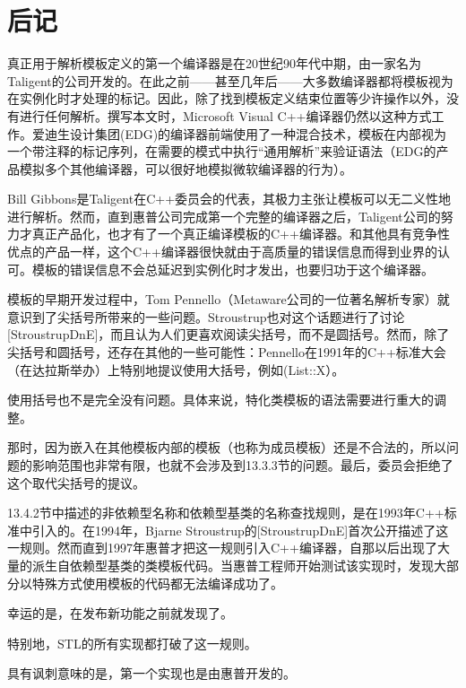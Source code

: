 \section{后记}
真正用于解析模板定义的第一个编译器是在20世纪90年代中期，由一家名为Taligent的公司开发的。在此之前——甚至几年后——大多数编译器都将模板视为在实例化时才处理的标记。因此，除了找到模板定义结束位置等少许操作以外，没有进行任何解析。撰写本文时，Microsoft Visual C++编译器仍然以这种方式工作。爱迪生设计集团(EDG)的编译器前端使用了一种混合技术，模板在内部视为一个带注释的标记序列，在需要的模式中执行“通用解析”来验证语法（EDG的产品模拟多个其他编译器，可以很好地模拟微软编译器的行为）。

Bill Gibbons是Taligent在C++委员会的代表，其极力主张让模板可以无二义性地进行解析。然而，直到惠普公司完成第一个完整的编译器之后，Taligent公司的努力才真正产品化，也才有了一个真正编译模板的C++编译器。和其他具有竞争性优点的产品一样，这个C++编译器很快就由于高质量的错误信息而得到业界的认可。模板的错误信息不会总延迟到实例化时才发出，也要归功于这个编译器。

模板的早期开发过程中，Tom Pennello（Metaware公司的一位著名解析专家）就意识到了尖括号所带来的一些问题。Stroustrup也对这个话题进行了讨论[StroustrupDnE]，而且认为人们更喜欢阅读尖括号，而不是圆括号。然而，除了尖括号和圆括号，还存在其他的一些可能性：Pennello在1991年的C++标准大会（在达拉斯举办）上特别地提议使用大括号，例如(List{::X}）。

\begin{notice}
使用括号也不是完全没有问题。具体来说，特化类模板的语法需要进行重大的调整。
\end{notice}

那时，因为嵌入在其他模板内部的模板（也称为成员模板）还是不合法的，所以问题的影响范围也非常有限，也就不会涉及到13.3.3节的问题。最后，委员会拒绝了这个取代尖括号的提议。

13.4.2节中描述的非依赖型名称和依赖型基类的名称查找规则，是在1993年C++标准中引入的。在1994年，Bjarne Stroustrup的[StroustrupDnE]首次公开描述了这一规则。然而直到1997年惠普才把这一规则引入C++编译器，自那以后出现了大量的派生自依赖型基类的类模板代码。当惠普工程师开始测试该实现时，发现大部分以特殊方式使用模板的代码都无法编译成功了。

\begin{notice}
幸运的是，在发布新功能之前就发现了。
\end{notice}

特别地，STL的所有实现都打破了这一规则。

\begin{notice}
具有讽刺意味的是，第一个实现也是由惠普开发的。
\end{notice}


